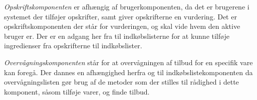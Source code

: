\textit{Opskriftskomponenten} er afhængig af brugerkomponenten, da det er brugerene i systemet der tilføjer opskrifter, samt giver opskrifterne en vurdering.
Det er opskriftskomponenten der står for vurderingen, og skal vide hvem den aktive bruger er.
Der er en adgang her fra til indkøbslisterne for at kunne tilføje ingredienser fra opskrifterne til indkøbslister.

\textit{Overvågningskomponenten} står for at overvågningen af tilbud for en specifik vare kan foregå.
Der dannes en afhængighed herfra og til indkøbslistekomponenten da overvågningslisten gør brug af de metoder som der stilles til rådighed i dette komponent, såsom tilføje varer, og finde tilbud.

